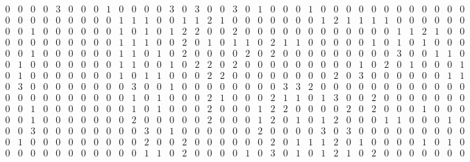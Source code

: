 \documentclass[11pt]{amsart}
\theoremstyle{plain}
\theoremstyle{definition}
\begin{document}
\[\begin{array}{*{37}{r}}
		0 & 0 & 0 & 0 & 3 & 0 & 0 & 0 & 1 & 0 & 0 & 0 & 0 & 3 & 0 & 3 & 0 & 0 & 3 & 0 & 1 & 0 & 0 & 0 & 1 & 0 & 0 & 0 & 0 & 0 & 0 & 0 & 0 & 0 & 0 & 0 & 0 \\
		0 & 0 & 0 & 0 & 0 & 0 & 0 & 0 & 0 & 1 & 1 & 1 & 0 & 0 & 1 & 1 & 2 & 1 & 0 & 0 & 0 & 0 & 0 & 0 & 0 & 1 & 2 & 1 & 1 & 1 & 1 & 0 & 0 & 0 & 0 & 0 & 0 \\
		0 & 0 & 1 & 0 & 0 & 0 & 0 & 0 & 0 & 1 & 0 & 1 & 0 & 1 & 2 & 2 & 0 & 0 & 2 & 0 & 0 & 0 & 0 & 0 & 0 & 0 & 0 & 0 & 0 & 0 & 0 & 1 & 1 & 2 & 1 & 0 & 0 \\
		0 & 0 & 0 & 0 & 0 & 0 & 0 & 0 & 0 & 1 & 1 & 1 & 0 & 0 & 2 & 0 & 1 & 0 & 1 & 1 & 0 & 2 & 1 & 1 & 0 & 0 & 0 & 0 & 0 & 1 & 0 & 1 & 0 & 1 & 0 & 0 & 0 \\
		0 & 0 & 1 & 0 & 0 & 0 & 0 & 0 & 0 & 1 & 1 & 0 & 1 & 0 & 2 & 0 & 0 & 0 & 0 & 2 & 0 & 2 & 0 & 0 & 0 & 0 & 0 & 0 & 0 & 0 & 0 & 3 & 0 & 0 & 1 & 1 & 0 \\
		0 & 1 & 0 & 0 & 0 & 0 & 0 & 0 & 0 & 1 & 1 & 0 & 0 & 1 & 0 & 2 & 2 & 0 & 2 & 0 & 0 & 0 & 0 & 0 & 0 & 0 & 0 & 0 & 1 & 0 & 2 & 0 & 1 & 0 & 0 & 0 & 1 \\
		0 & 1 & 0 & 0 & 0 & 0 & 0 & 0 & 0 & 1 & 0 & 1 & 1 & 0 & 0 & 0 & 2 & 2 & 0 & 0 & 0 & 0 & 0 & 0 & 0 & 0 & 2 & 0 & 3 & 0 & 0 & 0 & 0 & 0 & 0 & 1 & 1 \\
		0 & 3 & 0 & 0 & 0 & 0 & 0 & 0 & 0 & 0 & 3 & 0 & 0 & 1 & 0 & 0 & 0 & 0 & 0 & 0 & 0 & 0 & 3 & 3 & 2 & 0 & 0 & 0 & 0 & 0 & 0 & 0 & 0 & 0 & 0 & 0 & 0 \\
		0 & 0 & 0 & 0 & 0 & 0 & 0 & 0 & 0 & 0 & 1 & 0 & 1 & 0 & 0 & 0 & 2 & 1 & 0 & 0 & 0 & 2 & 1 & 1 & 0 & 1 & 3 & 0 & 0 & 2 & 0 & 0 & 0 & 0 & 0 & 0 & 0 \\
		0 & 0 & 1 & 0 & 0 & 0 & 0 & 0 & 0 & 0 & 1 & 0 & 1 & 0 & 0 & 0 & 2 & 0 & 0 & 0 & 1 & 2 & 2 & 0 & 0 & 0 & 0 & 2 & 0 & 2 & 0 & 0 & 0 & 1 & 0 & 0 & 0 \\
		0 & 0 & 1 & 0 & 0 & 0 & 0 & 0 & 0 & 0 & 2 & 0 & 0 & 0 & 0 & 0 & 2 & 0 & 0 & 0 & 1 & 2 & 0 & 1 & 0 & 1 & 2 & 0 & 0 & 0 & 1 & 1 & 0 & 0 & 0 & 1 & 0 \\
		0 & 0 & 3 & 0 & 0 & 0 & 0 & 0 & 0 & 0 & 0 & 3 & 0 & 1 & 0 & 0 & 0 & 0 & 0 & 0 & 2 & 0 & 0 & 0 & 0 & 3 & 0 & 3 & 0 & 0 & 0 & 0 & 0 & 0 & 0 & 0 & 0 \\
		0 & 1 & 0 & 0 & 0 & 0 & 0 & 0 & 0 & 0 & 0 & 2 & 0 & 0 & 2 & 0 & 0 & 0 & 0 & 0 & 0 & 2 & 0 & 1 & 1 & 1 & 2 & 0 & 1 & 0 & 0 & 0 & 0 & 1 & 0 & 1 & 0 \\
		0 & 0 & 0 & 0 & 0 & 0 & 0 & 0 & 0 & 0 & 0 & 1 & 1 & 0 & 2 & 0 & 0 & 0 & 0 & 1 & 0 & 3 & 0 & 1 & 0 & 1 & 2 & 1 & 0 & 2 & 0 & 0 & 0 & 0 & 0 & 0 & 0 \\

\end{array}\]
\end{document}
